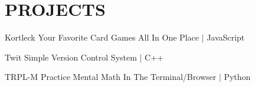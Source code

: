 \section{\textbf {\large PROJECTS}}
\resumeSubHeadingListStart %

    \resumeSubheading %
    {Kortleck}{}
    {Your Favorite Card Games All In One Place $ | $ JavaScript}{}
    \resumeItemListStart %
        \resumeItem{}
        \resumeItem{}
    \resumeItemListEnd %
    
    \resumeSubheading %
    {Twit}{}
    {Simple Version Control System $ | $ C++}{}
    \resumeItemListStart %
        \resumeItem{}
        \resumeItem{}
    \resumeItemListEnd %

    \resumeSubheading %
    {TRPL-M}{}
    {Practice Mental Math In The Terminal/Browser $ | $ Python}{}
    \resumeItemListStart %
        \resumeItem{}
        \resumeItem{}
    \resumeItemListEnd %
    

\resumeSubHeadingListEnd %